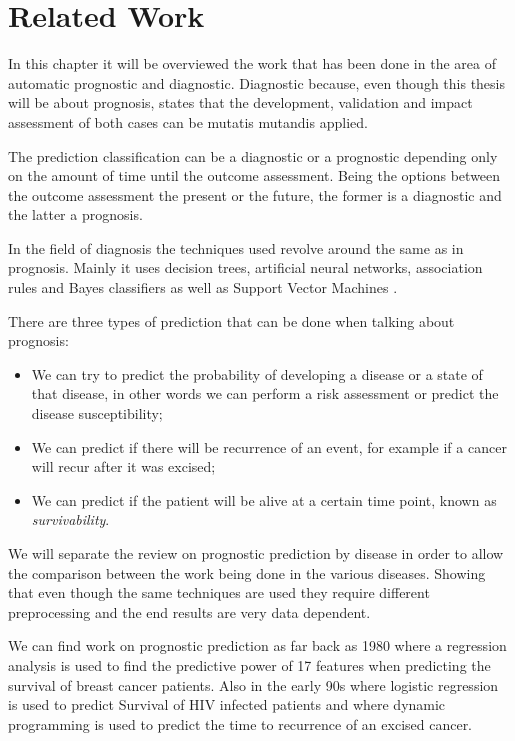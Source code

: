 \chapter{Related Work}
\label{chapter:rw}

In this chapter it will be overviewed the work that has been done in the area of automatic prognostic and diagnostic. Diagnostic because,
 even though this thesis will be about prognosis, \cite{Hendriksen2013} states that the development, 
 validation and impact assessment of both cases can be mutatis mutandis applied. 

The prediction classification can be a diagnostic or a prognostic depending only on the amount of time until the outcome assessment. 
Being the options between the outcome assessment the present or the future, the former is a diagnostic and the latter a prognosis.

In the field of diagnosis the techniques used revolve around the same as in prognosis. Mainly it uses decision trees, artificial 
neural networks, association rules and Bayes classifiers as well as Support Vector Machines \cite{Kharya2012}.

There are three types of prediction that can be done when talking about prognosis:
\begin{itemize}
\item We can try to predict the probability of developing a disease or a state of that disease, in other words we can perform
 a risk assessment or predict the disease susceptibility;
\item We can predict if there will be recurrence of an event, for example if a cancer will recur after it was excised;
\item We can predict if the patient will be alive at a certain time point, known as \emph{survivability}. 

\end{itemize}

We will separate the review on prognostic prediction by disease in order to allow the comparison between the work being done in the various 
diseases. Showing that even though the same techniques are used they require different preprocessing and the end results are very data dependent.

We can find work on prognostic prediction as far back as 1980 \cite{Nash1980} where a regression analysis is used 
to find the predictive power of 17 features when predicting the survival of breast cancer patients. Also in the early
 90s \cite{Hanson1993} where logistic regression is used to predict Survival of HIV infected patients and
 \cite{Mangasarian1995} where dynamic programming is used to predict the time to recurrence of an excised cancer.
 
